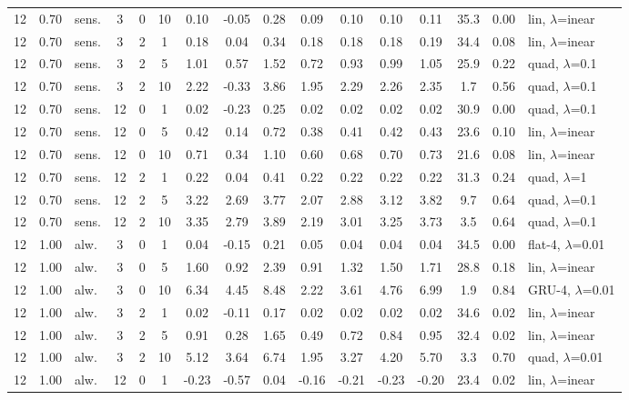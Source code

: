 \begin{scriptsize}
\begin{longtable}{cclcc c ccc ccc c cc l}
12 & 0.70 & sens. & 3 & 0 & 10 & 0.10 & -0.05 & 0.28 & 0.09 & 0.10 & 0.10 & 0.11 & 35.3 & 0.00 & lin, $\lambda$=inear \\
12 & 0.70 & sens. & 3 & 2 & 1 & 0.18 & 0.04 & 0.34 & 0.18 & 0.18 & 0.18 & 0.19 & 34.4 & 0.08 & lin, $\lambda$=inear \\
12 & 0.70 & sens. & 3 & 2 & 5 & 1.01 & 0.57 & 1.52 & 0.72 & 0.93 & 0.99 & 1.05 & 25.9 & 0.22 & quad, $\lambda$=0.1 \\
12 & 0.70 & sens. & 3 & 2 & 10 & 2.22 & -0.33 & 3.86 & 1.95 & 2.29 & 2.26 & 2.35 & 1.7 & 0.56 & quad, $\lambda$=0.1 \\
12 & 0.70 & sens. & 12 & 0 & 1 & 0.02 & -0.23 & 0.25 & 0.02 & 0.02 & 0.02 & 0.02 & 30.9 & 0.00 & quad, $\lambda$=0.1 \\
12 & 0.70 & sens. & 12 & 0 & 5 & 0.42 & 0.14 & 0.72 & 0.38 & 0.41 & 0.42 & 0.43 & 23.6 & 0.10 & lin, $\lambda$=inear \\
12 & 0.70 & sens. & 12 & 0 & 10 & 0.71 & 0.34 & 1.10 & 0.60 & 0.68 & 0.70 & 0.73 & 21.6 & 0.08 & lin, $\lambda$=inear \\
12 & 0.70 & sens. & 12 & 2 & 1 & 0.22 & 0.04 & 0.41 & 0.22 & 0.22 & 0.22 & 0.22 & 31.3 & 0.24 & quad, $\lambda$=1 \\
12 & 0.70 & sens. & 12 & 2 & 5 & 3.22 & 2.69 & 3.77 & 2.07 & 2.88 & 3.12 & 3.82 & 9.7 & 0.64 & quad, $\lambda$=0.1 \\
12 & 0.70 & sens. & 12 & 2 & 10 & 3.35 & 2.79 & 3.89 & 2.19 & 3.01 & 3.25 & 3.73 & 3.5 & 0.64 & quad, $\lambda$=0.1 \\
12 & 1.00 & alw. & 3 & 0 & 1 & 0.04 & -0.15 & 0.21 & 0.05 & 0.04 & 0.04 & 0.04 & 34.5 & 0.00 & flat-4, $\lambda$=0.01 \\
12 & 1.00 & alw. & 3 & 0 & 5 & 1.60 & 0.92 & 2.39 & 0.91 & 1.32 & 1.50 & 1.71 & 28.8 & 0.18 & lin, $\lambda$=inear \\
12 & 1.00 & alw. & 3 & 0 & 10 & 6.34 & 4.45 & 8.48 & 2.22 & 3.61 & 4.76 & 6.99 & 1.9 & 0.84 & GRU-4, $\lambda$=0.01 \\
12 & 1.00 & alw. & 3 & 2 & 1 & 0.02 & -0.11 & 0.17 & 0.02 & 0.02 & 0.02 & 0.02 & 34.6 & 0.02 & lin, $\lambda$=inear \\
12 & 1.00 & alw. & 3 & 2 & 5 & 0.91 & 0.28 & 1.65 & 0.49 & 0.72 & 0.84 & 0.95 & 32.4 & 0.02 & lin, $\lambda$=inear \\
12 & 1.00 & alw. & 3 & 2 & 10 & 5.12 & 3.64 & 6.74 & 1.95 & 3.27 & 4.20 & 5.70 & 3.3 & 0.70 & quad, $\lambda$=0.01 \\
12 & 1.00 & alw. & 12 & 0 & 1 & -0.23 & -0.57 & 0.04 & -0.16 & -0.21 & -0.23 & -0.20 & 23.4 & 0.02 & lin, $\lambda$=inear \\

\end{longtable}
\end{scriptsize}
